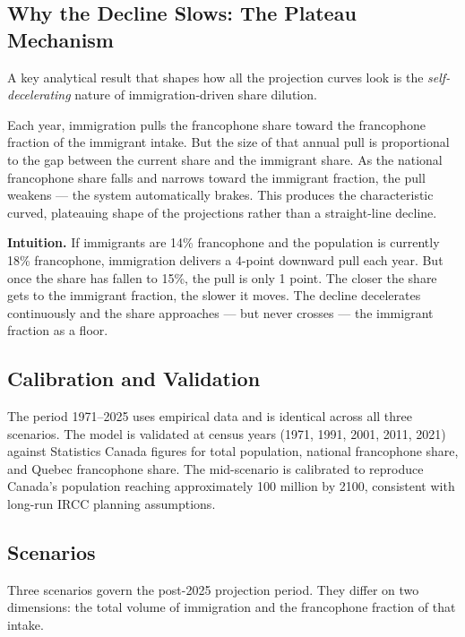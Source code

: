 \documentclass[11pt,a4paper]{article}
\begin{document}
\subsection{Why the Decline Slows: The Plateau Mechanism}

A key analytical result that shapes how all the projection curves look is the
\emph{self-decelerating} nature of immigration-driven share dilution.

Each year, immigration pulls the francophone share toward the francophone
fraction of the immigrant intake.  But the size of that annual pull is
proportional to the gap between the current share and the immigrant share.
As the national francophone share falls and narrows toward the immigrant
fraction, the pull weakens --- the system automatically brakes.  This produces
the characteristic curved, plateauing shape of the projections rather than a
straight-line decline.

\begin{tcolorbox}[findingbox]
\textbf{Intuition.}  If immigrants are 14\% francophone and the population is
currently 18\% francophone, immigration delivers a 4-point downward pull each
year.  But once the share has fallen to 15\%, the pull is only 1 point.  The
closer the share gets to the immigrant fraction, the slower it moves.  The
decline decelerates continuously and the share approaches --- but never
crosses --- the immigrant fraction as a floor.
\end{tcolorbox}

\subsection{Calibration and Validation}

The period 1971--2025 uses empirical data and is identical across all three
scenarios.  The model is validated at census years (1971, 1991, 2001, 2011,
2021) against Statistics Canada figures for total population, national
francophone share, and Quebec francophone share.  The mid-scenario is
calibrated to reproduce Canada's population reaching approximately 100 million
by 2100, consistent with long-run IRCC planning assumptions.

\subsection{Scenarios}

Three scenarios govern the post-2025 projection period.  They differ on two
dimensions: the total volume of immigration and the francophone fraction of
that intake.
\end{document}
